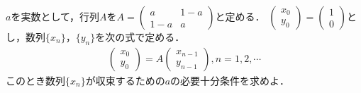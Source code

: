 \documentclass[../../main.tex]{subfiles}
\begin{document}
$a$を実数として，行列$A$を$A=
\begin{pmatrix}a&1-a \\ 1-a&a
\end{pmatrix}$と定める．
$
\begin{pmatrix}x_0 \\ y_0
\end{pmatrix}=
\begin{pmatrix} 1 \\ 0
\end{pmatrix}$とし，数列$\{x_n\}$，$\{y_n\}$を次の式で定める．
\begin{align*}
  \begin{pmatrix}
    x_0 \\ y_0
  \end{pmatrix}
  =A
  \begin{pmatrix}
    x_{n-1} \\
    y_{n-1}
  \end{pmatrix},
  n=1,2,\cdots
\end{align*}
このとき数列$\{x_n\}$が収束するための$a$の必要十分条件を求めよ．
\end{document}
